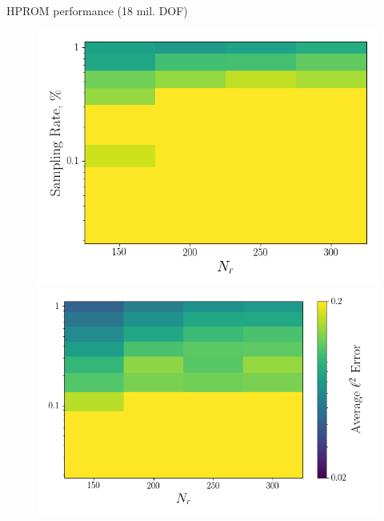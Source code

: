 \documentclass[]{beamer}
\begin{document}
\begin{frame}{HPROM performance (18 mil. DOF)}
\begin{figure}
		\begin{minipage}{0.35\linewidth}
			\includegraphics[width=0.99\linewidth]{Images/experiments/cvrc/err_contour_gnat1_dt5e-7.png}
		\end{minipage}
		\begin{minipage}{0.4\linewidth}
			\includegraphics[width=0.99\linewidth]{Images/experiments/cvrc/err_contour_gnat2_dt5e-7.png}
		\end{minipage}
	\end{figure}
\end{frame}
\end{document}

